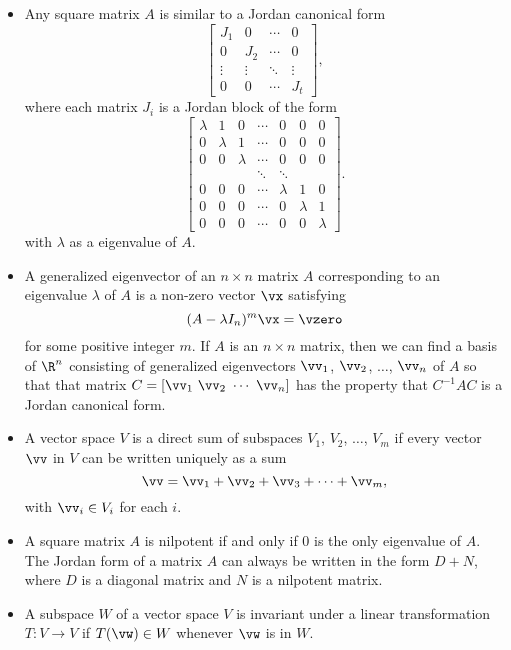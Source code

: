 \label{sec:jordan_summ}
\begin{itemize}

\item Any square matrix $A$ is similar to a Jordan canonical form 
\begin{equation*} 
\left[ \begin{array}{cccc} J_1&0&\cdots&0 \\ 0&J_2&\cdots&0 \\ \vdots&\vdots&\ddots&\vdots \\ 0&0&\cdots&J_t \end{array} \right],
\end{equation*}
where each matrix $J_i$ is a Jordan block of the form
\begin{equation*} 
\left[ \begin{array}{ccccccc} \lambda&1&0 &\cdots&0&0&0 \\ 0&\lambda&1&\cdots&0&0&0 \\ 0&0&\lambda&\cdots&0&0&0 \\ &&&\ddots&\ddots&& \\ 0&0&0&\cdots&\lambda&1&0 \\ 0&0&0&\cdots&0&\lambda&1 \\  0&0&0&\cdots&0&0&\lambda \end{array} \right].
\end{equation*}
with $\lambda$ as a eigenvalue of $A$.
\item A generalized eigenvector of an $n \times n$ matrix $A$ corresponding to an eigenvalue $\lambda$ of $A$ is a non-zero vector $\vx$ satisfying 
\[(A - \lambda I_n)^m \vx = \vzero\]
for some positive integer $m$. If $A$ is an $n \times n$ matrix, then we can find a basis of $\R^n$ consisting of generalized eigenvectors $\vv_1$, $\vv_2$, $\ldots$, $\vv_n$ of $A$ so that that matrix $C = [\vv_1 \ \vv_2 \ \cdots \ \vv_n]$ has the property that $C^{-1}AC$ is a Jordan canonical form. 
\item A vector space $V$ is a direct sum of subspaces $V_1$, $V_2$, $\ldots$, $V_m$ if every vector $\vv$ in $V$ can be written uniquely as a sum
\[\vv = \vv_1+\vv_2+\vv_3+\cdots + \vv_m,\]
with $\vv_i \in V_i$ for each $i$.
\item A square matrix $A$ is nilpotent if and only if $0$ is the only eigenvalue of $A$. The Jordan form of a matrix $A$ can always be written in the form $D + N$, where $D$ is a diagonal matrix and $N$ is a nilpotent matrix. 
\item A subspace $W$ of a vector space $V$ is invariant under a linear transformation $T: V \to V$ if $T(\vw) \in W$ whenever $\vw$ is in $W$.
\end{itemize}


